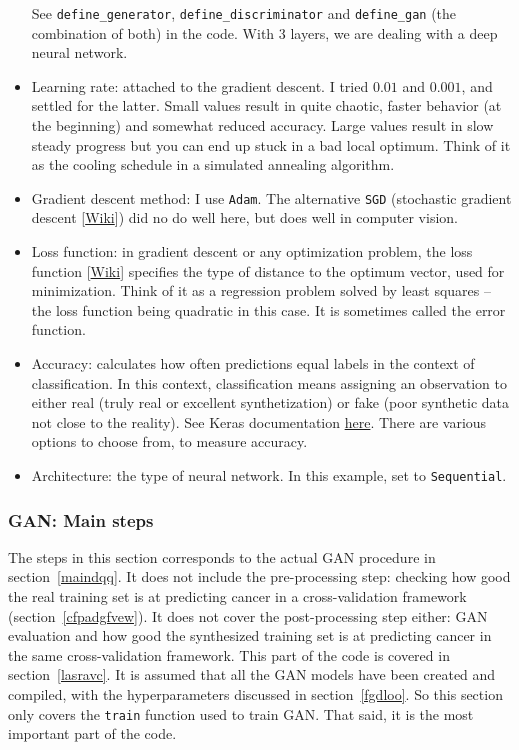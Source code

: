 \documentclass[oneside,10pt]{book}
\begin{document}
\begin{itemize}
See
\texttt{define\_generator}, \texttt{define\_discriminator}
 and \texttt{define\_gan} (the combination of both) in the code. With 3 layers, we are dealing with a
 \textcolor{index}{deep neural network}.
\item Learning rate: attached to the gradient descent. I tried $0.01$ and $0.001$, and settled for the latter. Small values result in quite chaotic, faster behavior (at the beginning) and somewhat reduced accuracy. Large values result in slow steady progress but you can end up stuck in a bad local optimum. Think
 of it as the cooling schedule in a simulated annealing algorithm.
\item Gradient descent method: I use \texttt{Adam}. The alternative \texttt{SGD}
(\textcolor{index}{stochastic gradient descent} [\href{https://en.wikipedia.org/wiki/Stochastic_gradient_descent}{Wiki}]) did no do well here, but does well in computer vision.
\item Loss function: in gradient descent or any optimization problem, the \textcolor{index}{loss function} [\href{https://en.wikipedia.org/wiki/Loss_function}{Wiki}] specifies the type of distance to the optimum vector, used for minimization. Think of it as a regression problem solved by least squares -- the loss function being quadratic in this case. It is sometimes called the error function.
\item Accuracy: calculates how often predictions equal labels in the context of classification. In this context, classification means assigning
 an observation to either real (truly real or excellent synthetization) or fake (poor synthetic data not close to the reality).
See Keras documentation \href{https://keras.io/api/metrics/accuracy_metrics/}{here}. There are various options to choose from, to measure accuracy.
\item Architecture: the type of neural network. In this example, set to \texttt{Sequential}.
\end{itemize}



\subsubsection{GAN: Main steps}

The steps in this section corresponds to the actual GAN procedure in section~\ref{maindqq}. It does not include the pre-processing step: checking how good the real training set is at predicting cancer in a
\textcolor{index}{cross-validation}
  framework (section~\ref{cfpadgfvew}). It does not cover the post-processing step either:
 GAN evaluation and how good the synthesized training set is at predicting cancer in the same cross-validation framework. This part of the code is covered
 in section~\ref{lasravc}. It is assumed that all the GAN models have been created and compiled, with the hyperparameters discussed
in section~\ref{fgdloo}. So this section only covers the \texttt{train} function used to train GAN.  That said, it is the most important part of the code.
\end{document}
